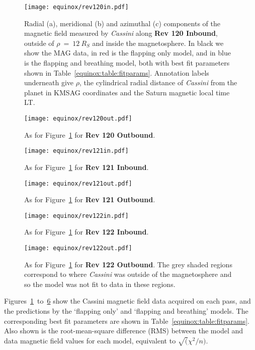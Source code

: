 \begin{figure}
\centering
\texttt{[image: equinox/rev120in.pdf]}
\caption[\textit{Cassini} magnetic field data, FO and F{\&}B model predictions for Rev 120 Inbound.]{Radial (a), meridional (b) and azimuthal (c) components of the magnetic field measured by \textit{Cassini} along \textbf{Rev 120 Inbound}, outside of $\rho~{=}~\SI{12}{R_S}$ and inside the magnetosphere. In black we show the MAG data, in red is the flapping only model, and in blue is the flapping and breathing model, both with best fit parameters shown in Table~\ref{equinox:table:fitparams}. Annotation labels underneath give $\rho$, the cylindrical radial distance of \textit{Cassini} from the planet in KMSAG coordinates and the Saturn magnetic local time LT.}
\label{equinox:fig:rev120in}
\end{figure}
\begin{figure}
\centering
\texttt{[image: equinox/rev120out.pdf]}
\caption[\textit{Cassini} MAG data, FO and F{\&}B model predictions for Rev 120 Outbound.]{As for Figure~\ref{equinox:fig:rev120in} for \textbf{Rev 120 Outbound}.}
\label{equinox:fig:rev120out}
\end{figure}
\begin{figure}
\centering
\texttt{[image: equinox/rev121in.pdf]}
\caption[\textit{Cassini} MAG data, FO and F{\&}B model predictions for Rev 121 Inbound.]{As for Figure~\ref{equinox:fig:rev120in} for \textbf{Rev 121 Inbound}.}
\label{equinox:fig:rev121in}
\end{figure}
\begin{figure}
\centering
\texttt{[image: equinox/rev121out.pdf]}
\caption[\textit{Cassini} MAG data, FO and F{\&}B model predictions for Rev 121 Outbound.]{As for Figure~\ref{equinox:fig:rev120in} for \textbf{Rev 121 Outbound}.}
\label{equinox:fig:rev121out}
\end{figure}
\begin{figure}
\centering
\texttt{[image: equinox/rev122in.pdf]}
\caption[\textit{Cassini} MAG data, FO and F{\&}B model predictions for Rev 122 Inbound.]{As for Figure~\ref{equinox:fig:rev120in} for \textbf{Rev 122 Inbound}.}
\label{equinox:fig:rev122in}
\end{figure}
\begin{figure}
\centering
\texttt{[image: equinox/rev122out.pdf]}
\caption[\textit{Cassini} MAG data, FO and F{\&}B model predictions for Rev 122 Outbound.]{As for Figure~\ref{equinox:fig:rev120in} for \textbf{Rev 122 Outbound}. The grey shaded regions correspond to where \textit{Cassini} was outside of the magnetosphere and so the model was not fit to data in these regions.}
\label{equinox:fig:rev122out}
\end{figure}
Figures~\ref{equinox:fig:rev120in}~to~\ref{equinox:fig:rev122out} show the Cassini magnetic field data acquired on each pass, and the predictions by the `flapping only' and `flapping and breathing' models. The corresponding best fit parameters are shown in Table~\ref{equinox:table:fitparams}. Also shown is the root-mean-square difference (RMS) between the model and data magnetic field values for each model, equivalent to $\sqrt( \chi^2/n)$.

